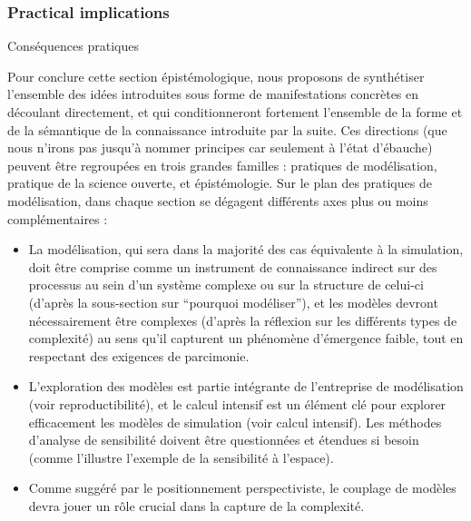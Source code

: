 





\subsubsection*{Practical implications}{Conséquences pratiques}


Pour conclure cette section épistémologique, nous proposons de synthétiser l'ensemble des idées introduites sous forme de manifestations concrètes en découlant directement, et qui conditionneront fortement l'ensemble de la forme et de la sémantique de la connaissance introduite par la suite. Ces directions (que nous n'irons pas jusqu'à nommer principes car seulement à l'état d'ébauche) peuvent être regroupées en trois grandes familles : pratiques de modélisation, pratique de la science ouverte, et épistémologie. Sur le plan des pratiques de modélisation, dans chaque section se dégagent différents axes plus ou moins complémentaires :

\begin{itemize}
	\item La modélisation, qui sera dans la majorité des cas équivalente à la simulation, doit être comprise comme un instrument de connaissance indirect sur des processus au sein d'un système complexe ou sur la structure de celui-ci (d'après la sous-section sur ``pourquoi modéliser''), et les modèles devront nécessairement être complexes (d'après la réflexion sur les différents types de complexité) au sens qu'il capturent un phénomène d'émergence faible, tout en respectant des exigences de parcimonie.
	\item L'exploration des modèles est partie intégrante de l'entreprise de modélisation (voir reproductibilité), et le calcul intensif est un élément clé pour explorer efficacement les modèles de simulation (voir calcul intensif). Les méthodes d'analyse de sensibilité doivent être questionnées et étendues si besoin (comme l'illustre l'exemple de la sensibilité à l'espace).
	\item Comme suggéré par le positionnement perspectiviste, le couplage de modèles devra jouer un rôle crucial dans la capture de la complexité.
\end{itemize}

